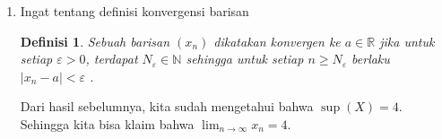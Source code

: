 \documentclass[10pt,openany,a4paper]{article}
\newcommand{\R}{\mathbb{R}}
\newcommand{\N}{\mathbb{N}}
\newtheorem*{teorema}{Teorema}
\newtheorem*{definisi}{Definisi}
\begin{document}
\begin{enumerate}
\begin{enumerate}
\begin{itemize}
                        \item Kedua kita akan buktikan bahwa $\sup(X)=4$.
                              \begin{teorema}
                                  Misalkan $H$ adalah himpunan tak kosong dari $\R$. Sebuah bilangan $b\in\R$ dikatakan sebagai supremum dari $H$ jika
                                  \begin{enumerate}
                                      \item $b\geq x$ untuk setiap $x\in H$.
                                      \item Untuk setiap $\varepsilon>0$, terdapat $x\in H$ sehingga $b-\varepsilon<x\leq b$.\\
                                  \end{enumerate}
                              \end{teorema}
                              Menggunakan teorema di atas, diperloleh
                              \begin{enumerate}
                                  \item Dari hasil (a), jelas bahwa $4$ adalah batas atas dari barisan $X$.
                                  \item Dengan sifat Archimedes, didapatkan untuk setiap $\varepsilon>0$ selalu terdapat $n_\varepsilon\in\N$ sehingga $\frac{1}{n_\varepsilon}<\varepsilon$. Informasi tersebut dapat digunakan sebagai berikut
                                        \[\left(2-\frac{1}{n_\varepsilon}\right)^2=4-\frac{4}{n_\varepsilon}+\frac{1}{n^2_\varepsilon}>4-\frac{4}{n_\varepsilon}\]
                                        Pilih $n_\varepsilon=\dfrac{4}{\varepsilon}$, sehingga
                                        \[4-\frac{4}{n_\varepsilon}>4-\varepsilon\]
                                        Hal ini menunjukkan terdapat $x=\left(2-\frac{1}{n_\varepsilon}\right)^2\in X$ sehingga $4-\varepsilon<x\leq 4$.\\
                              \end{enumerate}

                              $\therefore$ Terbukti $\sup(X)=4$.
                    \end{itemize}
              \item Ingat tentang definisi konvergensi barisan
                    \begin{definisi}
                        Sebuah barisan $(x_n)$ dikatakan konvergen ke $a\in\R$ jika untuk setiap $\varepsilon>0$, terdapat $N_\varepsilon\in\N$ sehingga untuk setiap $n\geq N_\varepsilon$ berlaku $|x_n-a|<\varepsilon$ .
                    \end{definisi}
                    Dari hasil sebelumnya, kita sudah mengetahui bahwa $\sup(X)=4$. Sehingga kita bisa klaim bahwa $\lim_{n\to\infty}x_n=4$.\\


\end{enumerate}
\end{enumerate}
\end{document}
